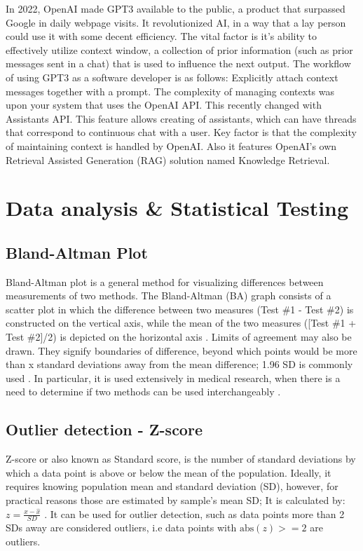  In 2022, OpenAI made GPT3 available to the public, a product that surpassed Google in daily webpage visits. It revolutionized AI, in a way that a lay person could use it with some decent efficiency. The vital factor is it's ability to effectively utilize context window, a collection of prior information (such as prior messages sent in a chat) that is used to influence the next output. The workflow of using GPT3 as a software developer is as follows: Explicitly attach context messages together with a prompt. The complexity of managing contexts was upon your system that uses the OpenAI API. This recently changed with Assistants API. This feature allows creating of assistants, which can have threads that correspond to continuous chat with a user. Key factor is that the complexity of maintaining context is handled by OpenAI. Also it features OpenAI's own Retrieval Assisted Generation (RAG) solution named Knowledge Retrieval. 


\section{Data analysis \& Statistical Testing}
\subsection{Bland-Altman Plot}
Bland-Altman plot is a general method for visualizing differences between measurements of two methods. The Bland-Altman (BA) graph consists of a scatter plot in which the difference between two measures (Test \#1 - Test \#2) is constructed on the vertical axis, while the mean of the two measures ([Test \#1 + Test \#2]/2) is depicted on the horizontal axis \cite{kaur2017bland}. Limits of agreement may also be drawn. They signify boundaries of difference, beyond which points would be more than x standard deviations away from the mean difference; 1.96 SD is commonly used \cite{myles2007using}.  In particular, it is used extensively in medical research, when there is a need to determine if two methods can be used interchangeably \cite{myles2007using}.
\subsection{Outlier detection - Z-score}
Z-score or also known as Standard score, is the number of standard deviations by which a data point is above or below the mean of the population. Ideally, it requires knowing population mean and standard deviation (SD), however, for practical reasons those are estimated by sample's mean SD; It is calculated by: $z=\frac{x-\hat{x}}{SD}$ \cite{zscoreBook}. It can be used for outlier detection, such as data points more than 2 SDs away are considered outliers, i.e data points with $\text{abs}(z) >= 2$ are outliers.
